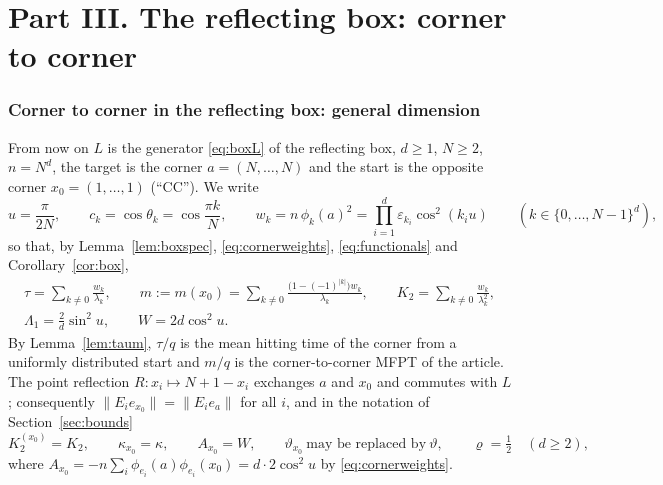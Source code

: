 \documentclass[11pt,a4paper]{article}
\theoremstyle{plain}
\theoremstyle{definition}
\numberwithin{equation}{section}
\begin{document}
\part*{Part III. The reflecting box: corner to corner}
\section{Corner to corner in the reflecting box: general dimension}\label{sec:corner}

From now on $L$ is the generator \eqref{eq:boxL} of the reflecting box, $d\ge1$, $N\ge2$, $n=N^d$, the target is the corner $a=(N,\dots,N)$ and the start is the opposite corner $x_0=(1,\dots,1)$ (``CC''). We write
\[
u=\frac{\pi}{2N},\qquad c_k=\cos\theta_k=\cos\frac{\pi k}{N},\qquad w_k=n\,\phi_k(a)^2=\prod_{i=1}^d\varepsilon_{k_i}\cos^2(k_iu)\qquad(k\in\{0,\dots,N-1\}^d),
\]
so that, by Lemma~\ref{lem:boxspec}, \eqref{eq:cornerweights}, \eqref{eq:functionals} and Corollary~\ref{cor:box},
\begin{equation}\label{eq:ccsums}
\begin{gathered}\tau=\sum_{k\ne0}\frac{w_k}{\lambda_k},\qquad m:=m(x_0)=\sum_{k\ne0}\frac{\big(1-(-1)^{|k|}\big)w_k}{\lambda_k},\qquad K_2=\sum_{k\ne0}\frac{w_k}{\lambda_k^2},\\
\Lambda_1=\frac2d\sin^2u,\qquad W=2d\cos^2u .\end{gathered}
\end{equation}
By Lemma~\ref{lem:taum}, $\tau/q$ is the mean hitting time of the corner from a uniformly distributed start and $m/q$ is the corner-to-corner MFPT of the article. The point reflection $R:x_i\mapsto N+1-x_i$ exchanges $a$ and $x_0$ and commutes with $L$; consequently $\|E_ie_{x_0}\|=\|E_ie_a\|$ for all $i$, and in the notation of Section~\ref{sec:bounds}
\begin{equation}\label{eq:ccdata}
K_2^{(x_0)}=K_2,\qquad\kappa_{x_0}=\kappa,\qquad A_{x_0}=W,\qquad \vartheta_{x_0}\ \text{may be replaced by}\ \vartheta,\qquad\varrho=\tfrac12\quad(d\ge2),
\end{equation}
where $A_{x_0}=-n\sum_{i}\phi_{e_i}(a)\phi_{e_i}(x_0)=d\cdot2\cos^2u$ by \eqref{eq:cornerweights}.
\end{document}
